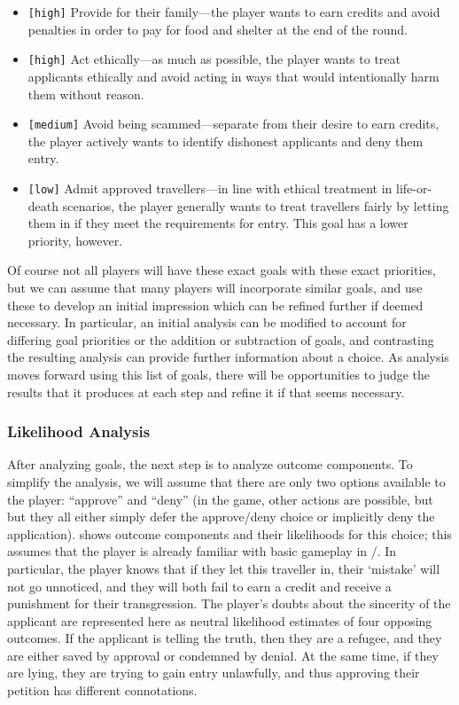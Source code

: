 \begin{itemize}
  \item \texttt{[high]} Provide for their family---the player wants to earn credits and avoid penalties in order to pay for food and shelter at the end of the round.
  \item \texttt{[high]} Act ethically---as much as possible, the player wants to treat applicants ethically and avoid acting in ways that would intentionally harm them without reason.
  \item \texttt{[medium]} Avoid being scammed---separate from their desire to earn credits, the player actively wants to identify dishonest applicants and deny them entry.
  \item \texttt{[low]} Admit approved travellers---in line with ethical treatment in life-or-death scenarios, the player generally wants to treat travellers fairly by letting them in if they meet the requirements for entry. This goal has a lower priority, however.
\end{itemize}

Of course not all players will have these exact goals with these exact priorities, but we can assume that many players will incorporate similar goals, and use these to develop an initial impression which can be refined further if deemed necessary.
%
In particular, an initial analysis can be modified to account for differing goal priorities or the addition or subtraction of goals, and contrasting the resulting analysis can provide further information about a choice.
%
As analysis moves forward using this list of goals, there will be opportunities to judge the results that it produces at each step and refine it if that seems necessary.

\subsubsection{Likelihood Analysis}

After analyzing goals, the next step is to analyze outcome components.
%
To simplify the analysis, we will assume that there are only two options available to the player: ``approve'' and ``deny'' (in the game, other actions are possible, but but they all either simply defer the approve/deny choice or implicitly deny the application).
%
 shows outcome components and their likelihoods for this choice; this assumes that the player is already familiar with basic gameplay in \papersplease/.
%
In particular, the player knows that if they let this traveller in, their `mistake' will not go unnoticed, and they will both fail to earn a credit and receive a punishment for their transgression.
%
The player's doubts about the sincerity of the applicant are represented here as neutral likelihood estimates of four opposing outcomes.
%
If the applicant is telling the truth, then they are a refugee, and they are either saved by approval or condemned by denial.
%
At the same time, if they are lying, they are trying to gain entry unlawfully, and thus approving their petition has different connotations.


